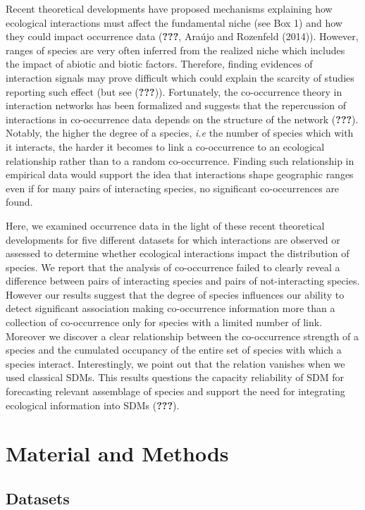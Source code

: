 Recent theoretical developments have proposed mechanisms explaining how
ecological interactions must affect the fundamental niche (see Box 1)
and how they could impact occurrence data ({\textbf{???}}, Araújo and
Rozenfeld (2014)). However, ranges of species are very often inferred
from the realized niche which includes the impact of abiotic and biotic
factors. Therefore, finding evidences of interaction signals may prove
difficult which could explain the scarcity of studies reporting such
effect (but see ({\textbf{???}})). Fortunately, the co-occurrence theory
in interaction networks has been formalized and suggests that the
repercussion of interactions in co-occurrence data depends on the
structure of the network ({\textbf{???}}). Notably, the higher the
degree of a species, \emph{i.e} the number of species which with it
interacts, the harder it becomes to link a co-occurrence to an
ecological relationship rather than to a random co-occurrence. Finding
such relationship in empirical data would support the idea that
interactions shape geographic ranges even if for many pairs of
interacting species, no significant co-occurrences are found.

Here, we examined occurrence data in the light of these recent
theoretical developments for five different datasets for which
interactions are observed or assessed to determine whether ecological
interactions impact the distribution of species. We report that the
analysis of co-occurrence failed to clearly reveal a difference between
pairs of interacting species and pairs of not-interacting species.
However our results suggest that the degree of species influences our
ability to detect significant association making co-occurrence
information more than a collection of co-occurrence only for species
with a limited number of link. Moreover we discover a clear relationship
between the co-occurrence strength of a species and the cumulated
occupancy of the entire set of species with which a species interact.
Interestingly, we point out that the relation vanishes when we used
classical SDMs. This results questions the capacity reliability of SDM
for forecasting relevant assemblage of species and support the need for
integrating ecological information into SDMs ({\textbf{???}}).

\section{Material and Methods}\label{material-and-methods}

\subsection{Datasets}\label{datasets}

